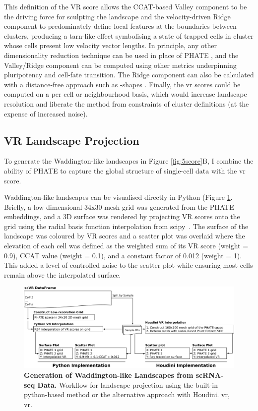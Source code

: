 This definition of the VR score allows the CCAT-based Valley component to be the driving force for sculpting the landscape and the velocity-driven Ridge component to predominately define local features at the boundaries between clusters, producing a tarn-like effect symbolising a state of trapped cells in cluster whose cells present low velocity vector lengths. In principle, any other dimensionality reduction technique can be used in place of PHATE \cite{chen_single-cell_2019}, and the Valley/Ridge component can be computed using other metrics underpinning pluripotency and cell-fate transition. The Ridge component can also be calculated with a distance-free approach such as \textalpha-shapes \cite{bellock_bellockkalphashape_2021}. Finally, the \acrshort{vr} scores could be computed on a per cell or neighbourhood basis, which would increase landscape resolution and liberate the method from constraints of cluster definitions (at the expense of increased noise).

\subsection{VR Landscape Projection}

To generate the Waddington-like landscapes in Figure \ref{fig:5score}B, I combine the ability of PHATE to capture the global structure of single-cell data with the \acrshort{vr} score.

Waddington-like landscapes can be visualised directly in Python (Figure \ref{fig:2land}. Briefly, a low dimensional 34x30 mesh grid was generated from the PHATE embeddings, and a 3D surface was rendered by projecting VR scores onto the grid using the radial basis function interpolation from scipy~\cite{virtanen_scipy_2020}. The surface of the landscape was coloured by VR scores and a scatter plot was overlaid where the elevation of each cell was defined as the weighted sum of its VR score (weight = 0.9), CCAT value (weight = 0.1), and a constant factor of 0.012 (weight = 1). This added a level of controlled noise to the scatter plot while ensuring most cells remain above the interpolated surface.

\begin{figure}
    \centering
    \includegraphics{02methods/figs/2VR_Landscape.png}
    \caption{\textbf{Generation of Waddington-like Landscapes from scRNA-seq Data.} Workflow for landscape projection using the built-in python-based method or the alternative approach with Houdini. \acrshort{vr}, \acrlong{vr}.}
    \label{fig:2land}
\end{figure}

